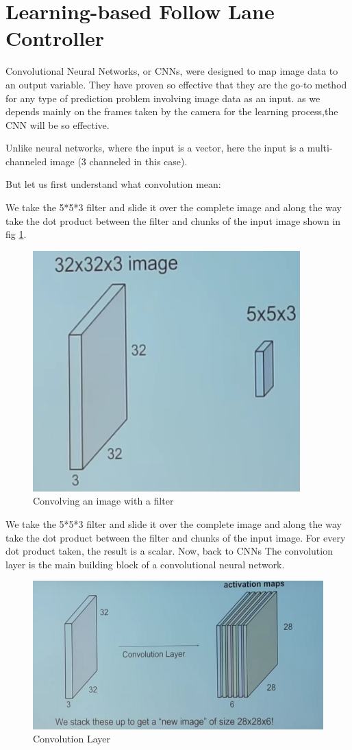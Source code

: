 \section{Learning-based Follow Lane Controller} \label{learn}

\hspace{2cm} Convolutional Neural Networks, or CNNs, were designed to map image data to an output variable.
They have proven so effective that they are the go-to method for any type of prediction problem involving image data as an input.
as we depends mainly on the frames taken by the camera for the learning process,the CNN will be so effective.

Unlike neural networks, where the input is a vector, here the input is a multi-channeled image (3 channeled in this case).

But let us first understand what convolution mean:

We take the 5*5*3 filter and slide it over the complete image and along the way take the dot product between the filter and chunks of the input image shown in fig \ref{fig: Convolving an image with a filter}. \newline

\begin{figure}[H]%
 \center
	\includegraphics[width=.4\textwidth]{images/Learningprocess/Convolve.png}
    \caption[Convolving an image with a filter]{Convolving an image with a filter}\label{fig: Convolving an image with a filter}%
  \end{figure}
  
We take the 5*5*3 filter and slide it over the complete image and along the way take the dot product between the filter and chunks of the input image.
For every dot product taken, the result is a scalar.
Now, back to CNNs The convolution layer is the main building block of a convolutional neural network.

\begin{figure}[H]%
    \center
	\includegraphics[width=.4\textwidth]{images/Learningprocess/layer.png}
    \caption[Convolution Layer]{Convolution Layer}\label{fig: Convolution Layer}%
\end{figure}
  

